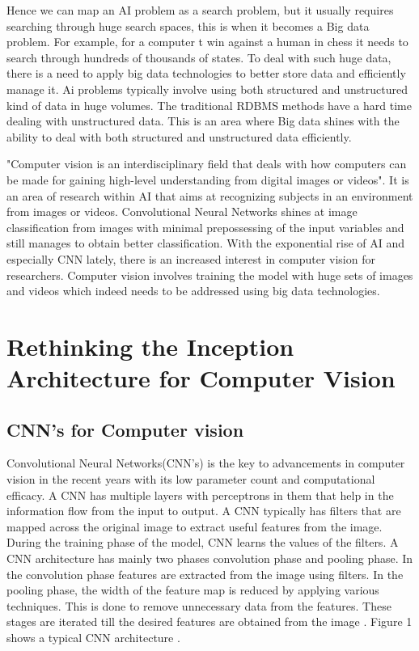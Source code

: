 \documentclass[sigconf]{acmart}
\begin{document}
Hence we can map an AI problem as a search problem, but it usually requires searching through huge search spaces, this is when it becomes a Big data problem. For example, for a computer t win against a human in chess it needs to search through hundreds of thousands of states. To deal with such huge data, there is a need to apply big data technologies to better store data and efficiently manage it. Ai problems typically involve using both structured and unstructured kind of data in huge volumes. The traditional RDBMS methods have a hard time dealing with unstructured data. This is an area where Big data shines with the ability to deal with both structured and unstructured data efficiently.

"Computer vision is an interdisciplinary field that deals with how computers can be made for gaining high-level understanding from digital images or videos".\cite{www-wiki1} It is an area of research within AI that aims at recognizing subjects in an environment from images or videos. Convolutional Neural Networks shines at image classification from images with minimal prepossessing of the input variables and still manages to obtain better classification. With the exponential rise of AI and especially CNN lately, there is an increased interest in computer vision for researchers. Computer vision involves training the model with huge sets of images and videos which indeed needs to be addressed using big data technologies.

\section{Rethinking the Inception Architecture for Computer Vision}

\subsection{CNN's for Computer vision}

Convolutional Neural Networks(CNN's) is the key to advancements in computer vision in the recent years with its low parameter count and computational efficacy. A CNN has multiple layers with perceptrons in them that help in the information flow from the input to output. A CNN typically has filters that are mapped across the original image to extract useful features from the image. During the training phase of the model, CNN learns the values of the filters. A CNN architecture has mainly two phases convolution phase and pooling phase. In the convolution phase features are extracted from the image using filters. In the pooling phase, the width of the feature map is reduced by applying various techniques. This is done to remove unnecessary data from the features. These stages are iterated till the desired features are obtained from the image \cite{Williamson}.   Figure 1 shows a typical CNN architecture \cite{google}.
\end{document}
